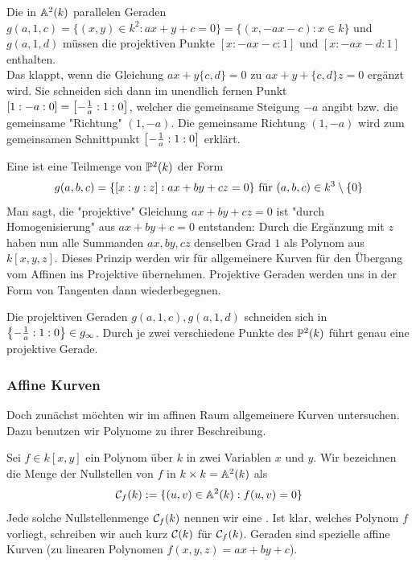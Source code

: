 Die in $\aff^2(k)$ parallelen Geraden $g(a,1,c) = \{(x,y) \in k^2 : ax + y + c = 0\} = \{(x,-ax-c) : x \in k\}$ und $g(a,1,d)$ müssen die projektiven Punkte $[x:-ax-c:1]$ und $[x:-ax-d:1]$ enthalten. \\
Das klappt, wenn die Gleichung $ax + y \{c,d\} = 0$ zu $ax + y + \{c,d\}z = 0$ ergänzt wird. 
Sie schneiden sich dann im unendlich fernen Punkt $[1 : -a : 0] = \benbrace*{-\frac{1}{a} : 1 : 0}$, welcher die gemeinsame Steigung $-a$ angibt bzw. die gemeinsame "Richtung" $(1,-a)$. 
Die gemeinsame Richtung $(1,-a)$ wird zum gemeinsamen Schnittpunkt $\benbrace*{-\frac{1}{a} : 1 : 0}$ erklärt.

\begin{defn}
	Eine  ist eine Teilmenge von $\PP^2(k)$ der Form
	\[ g(a,b,c) = \{ [x:y:z] : ax+by+cz = 0\} \text{ für } (a,b,c) \in k^3 \setminus \setnull \]
	Man sagt, die "projektive" Gleichung $ax+by+cz = 0$ ist "durch Homogenisierung" aus $ax+by+c = 0$ entstanden: Durch die Ergänzung mit $z$ haben nun alle Summanden $ax,by,cz$ denselben Grad $1$ als Polynom aus $k[x,y,z]$. 
	Dieses Prinzip werden wir für allgemeinere Kurven für den Übergang vom Affinen ins Projektive übernehmen. 
	Projektive Geraden werden uns in der Form von Tangenten dann wiederbegegnen.
\end{defn}

	Die projektiven Geraden $g(a,1,c),g(a,1,d)$ schneiden sich in $\penbrace*{-\frac{1}{a}:1:0} \in g_\infty$. 
	Durch je zwei verschiedene Punkte des $\PP^2(k)$ führt genau eine projektive Gerade.
	
\subsubsection{Affine Kurven}
\label{subsub:2.2.2}
	Doch zunächst möchten wir im affinen Raum allgemeinere Kurven untersuchen. 
	Dazu benutzen wir Polynome zu ihrer Beschreibung.
	
\begin{defn}
	Sei $f \in k[x,y]$ ein Polynom über $k$ in zwei Variablen $x$ und $y$. 
	Wir bezeichnen die Menge der Nullstellen von $f$ in $k \times k = \aff^2(k)$ als
	\[ \cc_f(k) := \{(u,v) \in \aff^2(k) : f(u,v) = 0\}\]
	Jede solche Nullstellenmenge $\cc_f(k)$ nennen wir eine . 
	Ist klar, welches Polynom $f$ vorliegt, schreiben wir auch kurz $\cc(k)$ für $\cc_f(k)$. 
	Geraden sind spezielle affine Kurven (zu linearen Polynomen $f(x,y,z) = ax+by+c$).
\end{defn}

